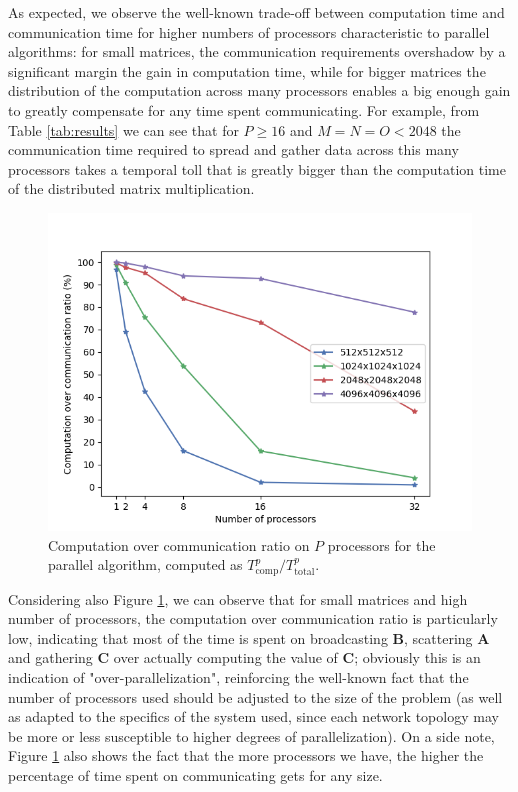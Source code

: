 As expected, we observe the well-known trade-off between computation time and communication time for higher numbers of processors characteristic to parallel algorithms: for small matrices, the communication requirements overshadow by a significant margin the gain in computation time, while for bigger matrices the distribution of the computation across many processors enables a big enough gain to greatly compensate for any time spent communicating. 
For example, from Table \ref{tab:results} we can see that for $P \ge 16$ and $M=N=O < 2048$ the communication time required to spread and gather data across this many processors takes a temporal toll that is greatly bigger than the computation time of the distributed matrix multiplication.

\begin{figure}[hb!]
    \centering
    \includegraphics[width=0.8\linewidth]{figures/comp_over_comm.png}
    \caption{Computation over communication ratio on $P$ processors for the parallel algorithm, computed as $T_{\text{comp}}^p/T_{\text{total}}^p.$}
    \label{fig:compcomm}
\end{figure}

Considering also Figure \ref{fig:compcomm}, we can observe that for small matrices and high number of processors, the computation over communication ratio is particularly low, indicating that most of the time is spent on broadcasting $\textbf{B}$, scattering $\textbf{A}$ and gathering $\textbf{C}$ over actually computing the value of $\textbf{C}$; obviously this is an indication of "over-parallelization", reinforcing the well-known fact that the number of processors used should be adjusted to the size of the problem (as well as adapted to the specifics of the system used, since each network topology may be more or less susceptible to higher degrees of parallelization).
On a side note, Figure \ref{fig:compcomm} also shows the fact that the more processors we have, the higher the percentage of time spent on communicating gets for any size.

